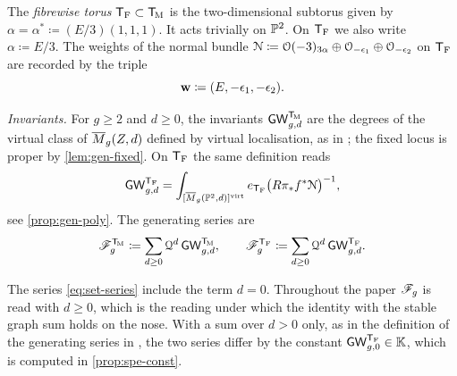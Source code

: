 The \emph{fibrewise torus} $\mathsf{T}_{\mathrm{F}}\subset\mathsf{T}_{\!\mathrm{M}}$ is the two-dimensional subtorus given by $\alpha=\alpha^*\coloneqq(E/3)(1,1,1)$. It acts trivially on $\mathbb{P}^2$. On $\mathsf{T}_{\mathrm{F}}$ we also write $\alpha\coloneqq E/3$. The weights of the normal bundle $\mathcal{N}\coloneqq\mathcal{O}(-3)_{3\alpha}\oplus\mathcal{O}_{-\epsilon_1}\oplus\mathcal{O}_{-\epsilon_2}$ on $\mathsf{T}_{\mathrm{F}}$ are recorded by the triple
\[
\mathbf{w}\coloneqq(E,-\epsilon_1,-\epsilon_2).
\]

\emph{Invariants.} For $g\geq 2$ and $d\geq 0$, the invariants $\mathsf{GW}_{g,d}^{\mathsf{T}_{\!\mathrm{M}}}$ are the degrees of the virtual class of $\overline{M}_g(Z,d)$ defined by virtual localisation, as in \cite{BS}; the fixed locus is proper by \cref{lem:gen-fixed}. On $\mathsf{T}_{\mathrm{F}}$ the same definition reads
\[
\mathsf{GW}_{g,d}^{\mathsf{T}_{\mathrm{F}}}=\int_{[\overline{M}_g(\mathbb{P}^2,d)]^{\mathrm{virt}}}e_{\mathsf{T}_{\mathrm{F}}}\big(R\pi_*f^*\mathcal{N}\big)^{-1},
\]
see \cref{prop:gen-poly}. The generating series are
\begin{equation}
\label{eq:set-series}
\mathscr{F}_g^{\mathsf{T}_{\!\mathrm{M}}}\coloneqq\sum_{d\geq 0}\mathcal{Q}^d\,\mathsf{GW}_{g,d}^{\mathsf{T}_{\!\mathrm{M}}},\qquad
\mathscr{F}_g^{\mathsf{T}_{\mathrm{F}}}\coloneqq\sum_{d\geq 0}\mathcal{Q}^d\,\mathsf{GW}_{g,d}^{\mathsf{T}_{\mathrm{F}}}.
\end{equation}

\begin{rmk}[The term $d=0$]
\label{rmk:set-d0}
The series \eqref{eq:set-series} include the term $d=0$. Throughout the paper $\mathscr{F}_g$ is read with $d\geq0$, which is the reading under which the identity with the stable graph sum holds on the nose. With a sum over $d>0$ only, as in the definition of the generating series in \cite{BS}, the two series differ by the constant $\mathsf{GW}_{g,0}^{\mathsf{T}_{\mathrm{F}}}\in\mathbb{K}$, which is computed in \cref{prop:spe-const}.
\end{rmk}

